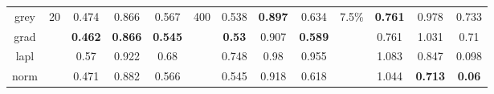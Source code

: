 \begin{table}[htbp]
\begin{tabular}{crrrrrrrrrrrr}
    grey  & \multicolumn{1}{r}{\multirow{4}[1]{*}{20}} & \multicolumn{1}{c}{0.474} & \multicolumn{1}{c}{0.866} & \multicolumn{1}{c}{0.567} & \multicolumn{1}{r}{\multirow{4}[1]{*}{400}} & \multicolumn{1}{c}{0.538} & \multicolumn{1}{c}{\textbf{0.897}} & \multicolumn{1}{c}{0.634} & \multicolumn{1}{r}{\multirow{4}[1]{*}{7.5\%}} & \multicolumn{1}{c}{\textbf{0.761}} & \multicolumn{1}{c}{0.978} & \multicolumn{1}{c}{0.733} \\
    grad  &       & \multicolumn{1}{c}{\textbf{0.462}} & \multicolumn{1}{c}{\textbf{0.866}} & \multicolumn{1}{c}{\textbf{0.545}} &       & \multicolumn{1}{c}{\textbf{0.53}} & \multicolumn{1}{c}{0.907} & \multicolumn{1}{c}{\textbf{0.589}} &       & \multicolumn{1}{c}{0.761} & \multicolumn{1}{c}{1.031} & \multicolumn{1}{c}{0.71} \\
    lapl  &       & \multicolumn{1}{c}{0.57} & \multicolumn{1}{c}{0.922} & \multicolumn{1}{c}{0.68} &       & \multicolumn{1}{c}{0.748} & \multicolumn{1}{c}{0.98} & \multicolumn{1}{c}{0.955} &       & \multicolumn{1}{c}{1.083} & \multicolumn{1}{c}{0.847} & \multicolumn{1}{c}{0.098} \\
    norm  &       & \multicolumn{1}{c}{0.471} & \multicolumn{1}{c}{0.882} & \multicolumn{1}{c}{0.566} &       & \multicolumn{1}{c}{0.545} & \multicolumn{1}{c}{0.918} & \multicolumn{1}{c}{0.618} &       & \multicolumn{1}{c}{1.044} & \multicolumn{1}{c}{\textbf{0.713}} & \multicolumn{1}{c}{\textbf{0.06}} \\
    \bottomrule
    \end{tabular}%
  \label{tab:noise_data_terms}%
\end{table}%


